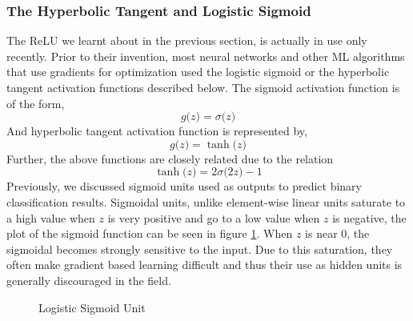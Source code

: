 \documentclass[12pt]{extarticle}
\numberwithin{equation}{section}
\begin{document}
	\subsubsection{The Hyperbolic Tangent and Logistic Sigmoid}
	The ReLU we learnt about in the previous section, is actually in use only recently. Prior to their invention, most neural networks and other ML algorithms that use gradients for optimization used the logistic sigmoid or the hyperbolic tangent activation functions described below.
	The sigmoid activation function is of the form,
	\begin{equation}
	g\big(z\big) = \sigma\big(z\big)
	\end{equation}
	And hyperbolic tangent activation function is represented by,
	\begin{equation}
	g\big(z\big) = \tanh\big(z\big)
	\end{equation}
	Further, the above functions are closely related due to the relation $$\tanh\big(z\big) = 2\sigma\big(2z\big) - 1$$
	Previously, we discussed sigmoid units used as outputs to predict binary classification results. Sigmoidal units, unlike element-wise linear units saturate to a high value when $z$ is very positive and go to a low value when $z$ is negative, the plot of the sigmoid function can be seen in figure \ref{sigmoid}. When $z$ is near 0, the sigmoidal becomes strongly sensitive to the input. Due to this saturation, they often make gradient based learning difficult and thus their use as hidden units is generally discouraged in the field.
	\begin{figure}[H]
		\centering
		\setlength{\fboxsep}{5pt}%
		\setlength{\fboxrule}{1pt}%
		\caption{Logistic Sigmoid Unit
			\label{sigmoid}}
	\end{figure}
\end{document}
